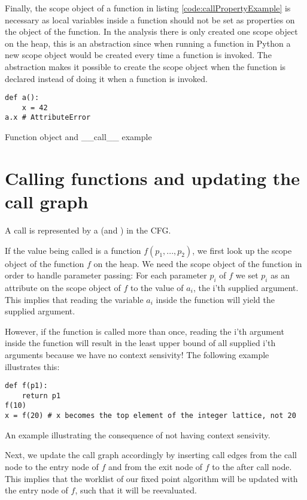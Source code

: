 Finally, the scope object of a function in listing \ref{code:callPropertyExample} is necessary as local variables inside a function should not be set as properties on the object of the function.
In the analysis there is only created one scope object on the heap, this is an abstraction since when running a function in Python a new scope object would be created every time a function is invoked. The abstraction makes it possible to create the scope object when the function is declared instead of doing it when a function is invoked.

\begin{listing}[H]
	\begin{verbatim}
def a(): 
	x = 42
a.x # AttributeError
	\end{verbatim}
\caption{Function object and \_\_call\_\_ example}\label{code:callPropertyExample}
\end{listing}


\section{Calling functions and updating the call graph}
A call is represented by a  (and ) in the CFG.

If the value being called is a function $f(p_1, ..., p_2)$, we first look up the scope object of the function $f$ on the heap. We need the scope object of the function in order to handle parameter passing: For each parameter $p_i$ of $f$ we set $p_i$ as an attribute on the scope object of $f$ to the value of $a_i$, the i'th supplied argument. This implies that reading the variable $a_i$ inside the function will yield the supplied argument.

However, if the function is called more than once, reading the i'th argument inside the function will result in the least upper bound of all supplied i'th arguments because we have no context sensivity! The following example illustrates this:

\begin{listing}[H]
	\begin{verbatim}
def f(p1): 
	return p1
f(10)
x = f(20) # x becomes the top element of the integer lattice, not 20
	\end{verbatim}
\caption{An example illustrating the consequence of not having context sensivity.}
\end{listing}

Next, we update the call graph accordingly by inserting call edges from the call node to the entry node of $f$ and from the exit node of $f$ to the after call node. This implies that the worklist of our fixed point algorithm will be updated with the entry node of $f$, such that it will be reevaluated.

